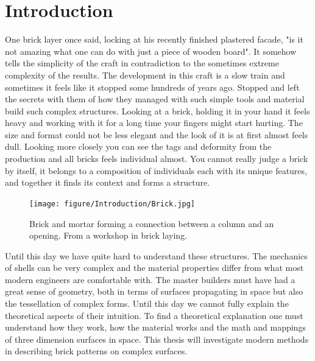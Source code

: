 \chapter{Introduction}

One brick layer once said, locking at his recently finished plastered facade, "is it not amazing what one can do with just a piece of wooden board". It somehow tells the simplicity of the craft in contradiction to the sometimes extreme complexity of the results. The development in this craft is a slow train and sometimes it feels like it stopped some hundreds of years ago. Stopped and left the secrets with them of how they managed with such simple tools and material build such complex structures. Looking at a brick, holding it in your hand it feels heavy and working with it for a long time your fingers might start hurting. The size and format could not be less elegant and the look of it is at first almost feels dull. Looking more closely you can see the tags and deformity from the production and all bricks feels individual almost. You cannot really judge a brick by itself, it belongs to a composition of individuals each with its unique features, and together it finds its context and forms a structure.

\begin{figure}[H]
\centering
\texttt{[image: figure/Introduction/Brick.jpg]}
\caption{Brick and mortar forming a connection between a column and an opening. From a workshop in brick laying.}
\end{figure}

Until this day we have quite hard to understand these structures. The mechanics of shells can be very complex and the material properties differ from what most modern engineers are comfortable with. The master builders must have had a great sense of geometry, both in terms of surfaces propagating in space but also the tessellation of complex forms. Until this day we cannot fully explain the theoretical aspects of their intuition. 
To find a theoretical explanation one must understand how they work, how the material works and the math and mappings of three dimension surfaces in space. This thesis will investigate modern methods in describing brick patterns on complex surfaces. 


